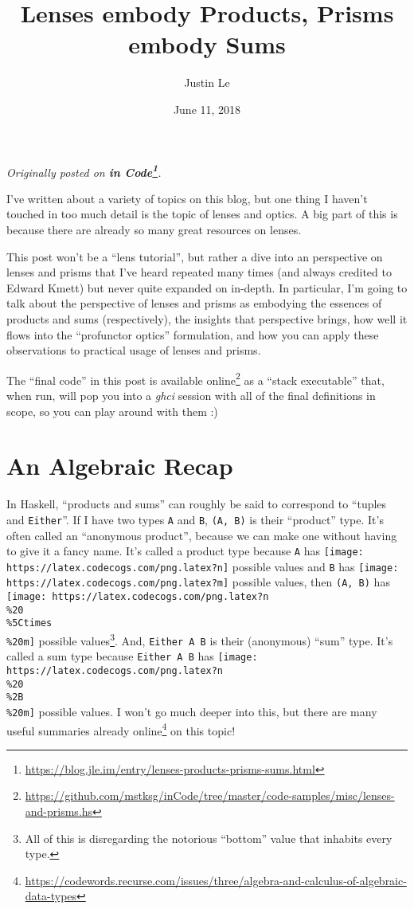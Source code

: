 \documentclass[]{article}
\title{Lenses embody Products, Prisms embody Sums}
\author{Justin Le}
\date{June 11, 2018}
\renewcommand{\href}[2]{#2\footnote{\url{#1}}}
\begin{document}
\maketitle

\emph{Originally posted on
\textbf{\href{https://blog.jle.im/entry/lenses-products-prisms-sums.html}{in
Code}}.}

I've written about a variety of topics on this blog, but one thing I haven't
touched in too much detail is the topic of lenses and optics. A big part of this
is because there are already so many great resources on lenses.

This post won't be a ``lens tutorial'', but rather a dive into an perspective on
lenses and prisms that I've heard repeated many times (and always credited to
Edward Kmett) but never quite expanded on in-depth. In particular, I'm going to
talk about the perspective of lenses and prisms as embodying the essences of
products and sums (respectively), the insights that perspective brings, how well
it flows into the ``profunctor optics'' formulation, and how you can apply these
observations to practical usage of lenses and prisms.

The ``final code'' in this post is
\href{https://github.com/mstksg/inCode/tree/master/code-samples/misc/lenses-and-prisms.hs}{available
online} as a ``stack executable'' that, when run, will pop you into a
\emph{ghci} session with all of the final definitions in scope, so you can play
around with them :)

\hypertarget{an-algebraic-recap}{%
\section{An Algebraic Recap}\label{an-algebraic-recap}}

In Haskell, ``products and sums'' can roughly be said to correspond to ``tuples
and \texttt{Either}''. If I have two types \texttt{A} and \texttt{B},
\texttt{(A,\ B)} is their ``product'' type. It's often called an ``anonymous
product'', because we can make one without having to give it a fancy name. It's
called a product type because \texttt{A} has
\texttt{[image: https://latex.codecogs.com/png.latex?n]} possible values and
\texttt{B} has \texttt{[image: https://latex.codecogs.com/png.latex?m]} possible
values, then \texttt{(A,\ B)} has
\texttt{[image: https://latex.codecogs.com/png.latex?n\\\%20\\\%5Ctimes\\\%20m]}
possible values\footnote{All of this is disregarding the notorious ``bottom''
  value that inhabits every type.}. And, \texttt{Either\ A\ B} is their
(anonymous) ``sum'' type. It's called a sum type because \texttt{Either\ A\ B}
has \texttt{[image: https://latex.codecogs.com/png.latex?n\\\%20\\\%2B\\\%20m]}
possible values. I won't go much deeper into this, but there are
\href{https://codewords.recurse.com/issues/three/algebra-and-calculus-of-algebraic-data-types}{many
useful summaries already online} on this topic!
\end{document}

